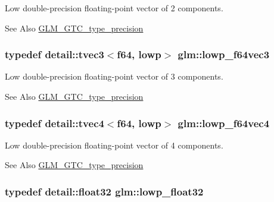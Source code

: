 Low double-\/precision floating-\/point vector of 2 components. \begin{DoxySeeAlso}{See Also}
\hyperlink{group__gtc__type__precision}{G\-L\-M\-\_\-\-G\-T\-C\-\_\-type\-\_\-precision} 
\end{DoxySeeAlso}
\hypertarget{group__gtc__type__precision_gad2d5e1436d926ae7201c860dce01a0fe}{
\subsubsection[{lowp\-\_\-f64vec3}]{\setlength{\rightskip}{0pt plus 5cm}typedef detail\-::tvec3$<$f64, lowp$>$ {\bf glm\-::lowp\-\_\-f64vec3}}}\label{group__gtc__type__precision_gad2d5e1436d926ae7201c860dce01a0fe}
Low double-\/precision floating-\/point vector of 3 components. \begin{DoxySeeAlso}{See Also}
\hyperlink{group__gtc__type__precision}{G\-L\-M\-\_\-\-G\-T\-C\-\_\-type\-\_\-precision} 
\end{DoxySeeAlso}
\hypertarget{group__gtc__type__precision_gaf99497c42a2d011fecab7f3f2312213d}{
\subsubsection[{lowp\-\_\-f64vec4}]{\setlength{\rightskip}{0pt plus 5cm}typedef detail\-::tvec4$<$f64, lowp$>$ {\bf glm\-::lowp\-\_\-f64vec4}}}\label{group__gtc__type__precision_gaf99497c42a2d011fecab7f3f2312213d}
Low double-\/precision floating-\/point vector of 4 components. \begin{DoxySeeAlso}{See Also}
\hyperlink{group__gtc__type__precision}{G\-L\-M\-\_\-\-G\-T\-C\-\_\-type\-\_\-precision} 
\end{DoxySeeAlso}
\hypertarget{group__gtc__type__precision_ga92be8087f3c84504f3a44af1a9efc51e}{
\subsubsection[{lowp\-\_\-float32}]{\setlength{\rightskip}{0pt plus 5cm}typedef detail\-::float32 {\bf glm\-::lowp\-\_\-float32}}}\label{group__gtc__type__precision_ga92be8087f3c84504f3a44af1a9efc51e}
